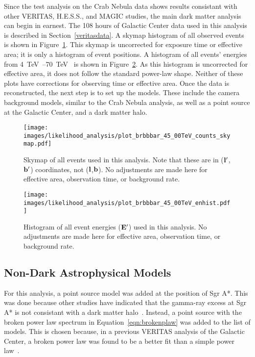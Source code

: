   Since the test analysis on the Crab Nebula data shows results consistant with other VERITAS, H.E.S.S., and MAGIC studies, the main dark matter analysis can begin in earnest.
  The 108 hours of Galactic Center data used in this analysis is described in Section~\ref{veritasdata}.
  A skymap histogram of all observed events is shown in Figure~\ref{fig:gc_counts_skymap}.
  This skymap is uncorrected for exposure time or effective area; it is only a histogram of event positions.
  A histogram of all events' energies from \SIrange{4}{70}{\TeV{}} is shown in Figure~\ref{fig:gc_counts_enhist}.
  As this histogram is uncorrected for effective area, it does not follow the standard power-law shape.
  Neither of these plots have corrections for observing time or effective area.
  Once the data is reconstructed, the next step is to set up the models.
  These include the camera background models, similar to the Crab Nebula analysis, as well as a point source at the Galactic Center, and a dark matter halo.
  
  \begin{figure}[bt]
    \centering
    \texttt{[image: images/likelihood\_analysis/plot\_brbbbar\_45\_00TeV\_counts\_skymap.pdf]}
    \caption[Galactic Center Counts Skymap]{
      Skymap of all events used in this analysis.
      Note that these are in ($\mathbf{l'}$,$\mathbf{b'}$) coordinates, not ($\mathbf{l }$,$\mathbf{b }$).
      No adjustments are made here for effective area, observation time, or background rate.
    }
    \label{fig:gc_counts_skymap}
  \end{figure}
  
  \begin{figure}[tb]
    \centering
    \texttt{[image: images/likelihood\_analysis/plot\_brbbbar\_45\_00TeV\_enhist.pdf]}
    \caption[Galactic Center Counts Energy Histogram]{
      Histogram of all event energies ($\mathbf{E'}$) used in this analysis.
      No adjustments are made here for effective area, observation time, or background rate.
    }
    \label{fig:gc_counts_enhist}
  \end{figure}

  \FloatBarrier

  \subsection{Non-Dark Astrophysical Models}\label{subsec:gcpointsrc}
  For this analysis, a point source model was added at the position of Sgr A*.
  This was done because other studies have indicated that the gamma-ray excess at Sgr A* is not consistant with a dark matter halo~\cite{gc_pnt_is_not_dm1, gc_pnt_is_not_dm2, gc_pnt_is_not_dm3}.
  Instead, a point source with the broken power law spectrum in Equation~\ref{eqn:brokenplaw} was added to the list of models.
  This is chosen because, in a previous VERITAS analysis of the Galactic Center, a broken power law was found to be a better fit than a simple power law~\cite{VeritasGCRidge2015}.
  
